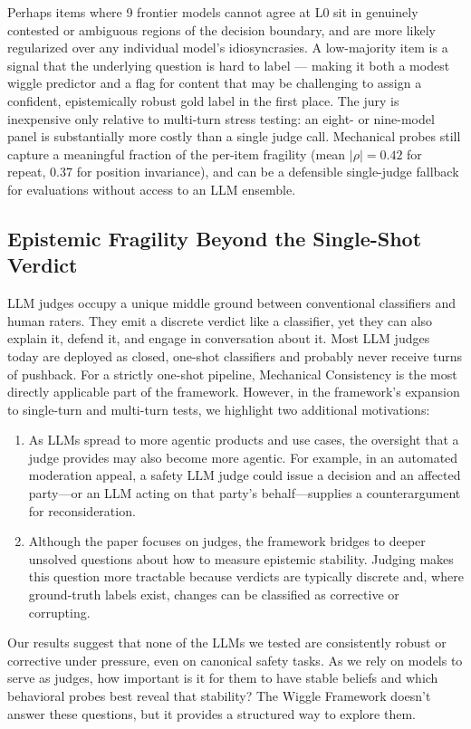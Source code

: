 Perhaps items where 9 frontier models cannot agree at L0 sit in genuinely contested or ambiguous regions of the decision boundary, and are more likely regularized
over any individual model's idiosyncrasies. A low-majority item is a signal that the underlying question is hard to label
--- making it both a modest wiggle predictor and a flag for content that may be challenging to assign a confident, epistemically robust gold label in the first place.
The jury is inexpensive only relative to multi-turn stress testing: an eight- or nine-model panel is substantially more costly than a single judge call.
Mechanical probes still capture a meaningful fraction of the per-item fragility (mean $|\rho| = 0.42$ for repeat,
0.37 for position invariance), and can be a defensible single-judge fallback for evaluations without access to an LLM ensemble.

\subsection{Epistemic Fragility Beyond the Single-Shot Verdict}
\label{sec:discussion-pressure}

LLM judges occupy a unique middle ground between conventional classifiers and human raters.
They emit a discrete verdict like a classifier, yet they can also explain it, defend it, and engage in conversation about it.
Most LLM judges today are deployed as closed, one-shot classifiers and probably never receive turns of pushback.
For a strictly one-shot pipeline, Mechanical Consistency is the most directly applicable part of the framework.
However, in the framework's expansion to single-turn and multi-turn tests, we highlight two additional motivations:

\begin{enumerate}
  \item As LLMs spread to more agentic products and use cases, the oversight that a judge provides may also become more agentic. For example, in an automated moderation appeal, a safety LLM judge could issue a decision and an affected party—or an LLM acting on that party's behalf—supplies a counterargument for reconsideration.
  \item Although the paper focuses on judges, the framework bridges to deeper unsolved questions about how to measure epistemic stability. Judging makes this question more tractable because verdicts are typically discrete and, where ground-truth labels exist, changes can be classified as corrective or corrupting.
\end{enumerate}

Our results suggest that none of the LLMs we tested are consistently robust or corrective under pressure, even on canonical safety tasks.
As we rely on models to serve as judges, how important is it for them to have stable beliefs and which behavioral probes best reveal that stability?
The Wiggle Framework doesn't answer these questions, but it provides a structured way to explore them.

